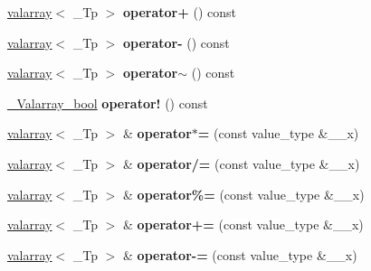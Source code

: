 \begin{DoxyCompactItemize}
\item 
\mbox{\label{classvalarray_a1cba49e9a6f362506c969602c1ab4f70}} 
\hyperlink{classvalarray}{valarray}$<$ \+\_\+\+Tp $>$ {\bfseries operator+} () const
\item 
\mbox{\label{classvalarray_a4092723146625e6ca869629e80b017c3}} 
\hyperlink{classvalarray}{valarray}$<$ \+\_\+\+Tp $>$ {\bfseries operator-\/} () const
\item 
\mbox{\label{classvalarray_a2a87a144fcd311fa6813913c136270aa}} 
\hyperlink{classvalarray}{valarray}$<$ \+\_\+\+Tp $>$ {\bfseries operator$\sim$} () const
\item 
\mbox{\label{classvalarray_a1940fc622d7aac0eaa96edd7b460a3ee}} 
\hyperlink{classvalarray}{\+\_\+\+Valarray\+\_\+bool} {\bfseries operator!} () const
\item 
\mbox{\label{classvalarray_a34b664916b291ac34edd306a04e2b7ff}} 
\hyperlink{classvalarray}{valarray}$<$ \+\_\+\+Tp $>$ \& {\bfseries operator$\ast$=} (const value\+\_\+type \&\+\_\+\+\_\+x)
\item 
\mbox{\label{classvalarray_a4cbd348be1cc53158e6643328cf50ba3}} 
\hyperlink{classvalarray}{valarray}$<$ \+\_\+\+Tp $>$ \& {\bfseries operator/=} (const value\+\_\+type \&\+\_\+\+\_\+x)
\item 
\mbox{\label{classvalarray_a4b3167f14edd7d7507ad5746e4ff3977}} 
\hyperlink{classvalarray}{valarray}$<$ \+\_\+\+Tp $>$ \& {\bfseries operator\%=} (const value\+\_\+type \&\+\_\+\+\_\+x)
\item 
\mbox{\label{classvalarray_a9fb6b9bf0c4bd4f9a3aa5f0a21a2281c}} 
\hyperlink{classvalarray}{valarray}$<$ \+\_\+\+Tp $>$ \& {\bfseries operator+=} (const value\+\_\+type \&\+\_\+\+\_\+x)
\item 
\mbox{\label{classvalarray_a9e2d70d8a4e4fd32a6974b5dfe222195}} 
\hyperlink{classvalarray}{valarray}$<$ \+\_\+\+Tp $>$ \& {\bfseries operator-\/=} (const value\+\_\+type \&\+\_\+\+\_\+x)
\item 
\mbox{\label{classvalarray_a729ad4ac70352dd76b909de8b918a8a1}} 

\end{DoxyCompactItemize}
